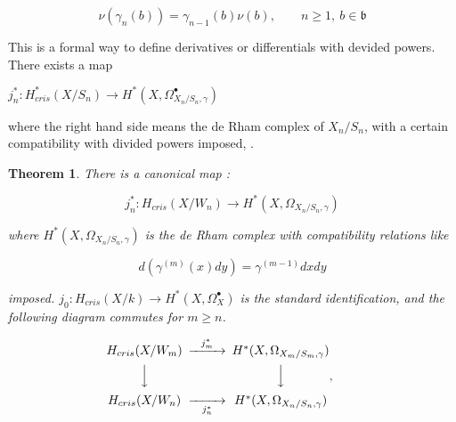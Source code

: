 \documentclass[12pt,twoside]{amsart}
\newtheorem{theorem}{Theorem}[section]
\begin{document}
\[ \nu (\gamma_n (b))=\gamma_{n-1}(b)\nu(b), \qquad n \geq 1, \ b \in \mathfrak{b} \]

\vspace{0.5cm}

\noindent
This is a formal way to define derivatives or differentials with devided powers. There exists a map 

\vspace{0.5cm}

\begin{center}
$j_n^*:H_{cris}^*(X/S_n) \to H^*(X,\Omega_{X_n/S_n, \gamma}^{\bullet})$ 
\end{center}

\vspace{0.5cm}

\noindent
where the right hand side means the de Rham complex of $X_n/S_n$, with a certain compatibility with divided powers imposed, \cite{BL}.

\vspace{0.5cm} 

\begin{theorem} \cite{BL}
There is a canonical map :

\[ j_n^*:H_{cris}(X/W_n) \to H^*(X,\Omega_{X_n/S_n,\gamma}) \]

\vspace{0.5cm}

\noindent
where $H^*(X,\Omega_{X_n/S_n,\gamma})$ is the de Rham complex with compatibility relations like 

\[ d(\gamma^{(m)}(x)dy)=\gamma^{(m-1)}dxdy \]

\vspace{0.5cm}

\noindent
imposed. $j_0: H_{cris}(X/k) \to H^*(X,\Omega_X^{\bullet}) $ is the standard identification, and the following diagram commutes for $m \geq n$.

\begin{equation}
\begin{CD}
H_{cris}(X/W_m) @>{j_m^*}>> H^*(X,\Omega_{X_m/S_m,\gamma}) \\
@VVV        @VVV\\
H_{cris}(X/W_n) @>>{j_n^*}> H^*(X,\Omega_{X_n/S_n,\gamma}) 
\end{CD} , \qquad  
\end{equation}

\end{theorem}

\vspace{0.5cm}
\end{document}
